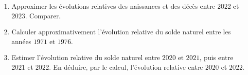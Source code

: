 \documentclass[a4paper, 14pt]{extarticle}
\theoremstyle{plain}
\theoremstyle{definition}
\begin{document}
{\begin{enumerate}
		\item Approximer les évolutions relatives des naissances et des décès entre $2022$ et $2023$. Comparer.
		
		\item Calculer approximativement l'évolution relative du solde naturel entre les années $1971$ et $1976$.
		
		\item Estimer l'évolution relative du solde naturel entre $2020$ et $2021$, puis entre $2021$ et $2022$.
		En déduire, par le calcul, l'évolution relative entre $2020$ et $2022$.

	\end{enumerate}
}{}
\end{document}
